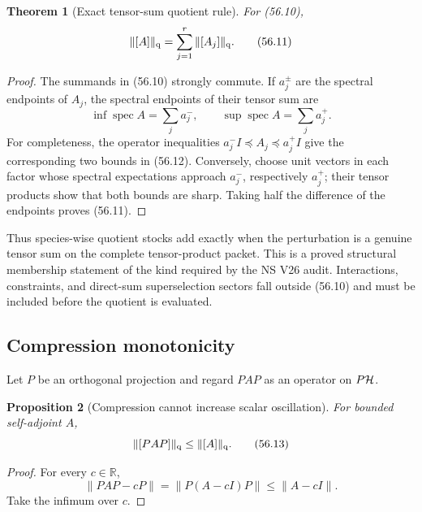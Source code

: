 \documentclass[11pt]{article}
\newtheorem{theorem}{Theorem}[section]
\newtheorem{proposition}[theorem]{Proposition}
\theoremstyle{remark}
\begin{document}
\begin{theorem}[Exact tensor-sum quotient rule]
\label{thm:v12v56-tensor-sum}
For (56.10),
\begin{equation}
                         \|[A]\|_{\rm q}
 =
 \sum_{j=1}^r\|[A_j]\|_{\rm q}.                   \tag{56.11}
\end{equation}
\end{theorem}

\begin{proof}
The summands in (56.10) strongly commute.  If
\(a_j^\pm\) are the spectral endpoints of \(A_j\), the spectral
endpoints of their tensor sum are
\begin{equation}
 \inf\operatorname{spec}A=\sum_j a_j^-,
 \qquad
 \sup\operatorname{spec}A=\sum_j a_j^+.           \tag{56.12}
\end{equation}
For completeness, the operator inequalities
\(a_j^-I\preceq A_j\preceq a_j^+I\) give the corresponding two
bounds in (56.12).  Conversely, choose unit vectors in each factor
whose spectral expectations approach \(a_j^-\), respectively
\(a_j^+\); their tensor products show that both bounds are sharp.
Taking half the difference of the endpoints proves (56.11).
\end{proof}

Thus species-wise quotient stocks add exactly when the perturbation
is a genuine tensor sum on the complete tensor-product packet.  This
is a proved structural membership statement of the kind required by
the NS V26 audit.  Interactions, constraints, and direct-sum
superselection sectors fall outside (56.10) and must be included
before the quotient is evaluated.

\subsection{Compression monotonicity}

Let \(P\) be an orthogonal projection and regard \(PAP\) as an
operator on \(P{\cal H}\).

\begin{proposition}[Compression cannot increase scalar oscillation]
\label{prop:v12v56-compression}
For bounded self-adjoint \(A\),
\begin{equation}
                         \|[PAP]\|_{\rm q}
 \leq\|[A]\|_{\rm q}.                             \tag{56.13}
\end{equation}
\end{proposition}

\begin{proof}
For every \(c\in\mathbb R\),
\[
 \|PAP-cP\|
 =
 \|P(A-cI)P\|
 \leq\|A-cI\|.
\]
Take the infimum over \(c\).
\end{proof}
\end{document}
